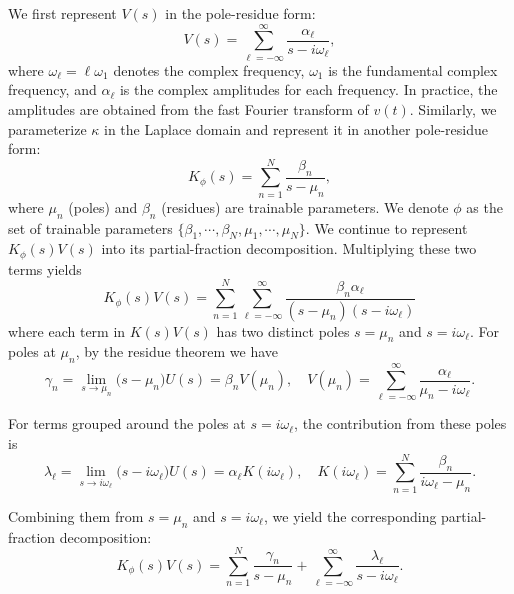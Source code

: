 We first represent $V(s)$ in the pole-residue form:
\begin{equation}\label{eq:force_laplace}
V(s)
 = 
\sum_{\ell=-\infty}^{\infty}
\frac{\alpha_{\ell}}{ s - i\omega_{\ell} },
\end{equation}
where $\omega_{\ell} = \ell \omega_1$ denotes the complex frequency, $\omega_1$  is the fundamental complex frequency, and $\alpha_{\ell}$ is the complex amplitudes for each frequency. In practice, the amplitudes are obtained from the fast Fourier transform of $v(t)$. Similarly, we parameterize $\kappa$ in the Laplace domain and represent it in another pole-residue form:
\begin{equation}\label{eq:pole_res_lap}
K_\phi(s)
 = 
\sum_{n=1}^{N}
\frac{\beta_{n}}{s - \mu_{n}},
\end{equation}
where $\mu_n$ ({poles}) and $\beta_n$ ({residues}) are trainable parameters. We denote $\phi$ as the set of trainable parameters $\{\beta_1, \cdots, \beta_N, \mu_1, \cdots, \mu_N\}$. We continue to represent $K_\phi(s) V(s)$ into its partial-fraction decomposition. Multiplying these two terms yields
$$K_\phi(s) V(s)=\sum_{n=1}^{N}
\sum_{\ell=-\infty}^{\infty}
\frac{\beta_{n}\alpha_{\ell}}{ (s - \mu_{n})(s - i\omega_{\ell}) }$$
where each term in $K(s) V(s)$ has two distinct poles $s=\mu_{n}$ and $s=i\omega_{\ell}$. 
For poles at $\mu_n$, by the residue theorem we have
\begin{equation}\label{eq:residue_gamma}
    \gamma_n
 = 
\lim_{s \to \mu_n}
\bigl(s - \mu_n\bigr) U(s)
 = 
\beta_n V(\mu_n),\quad V(\mu_n)
 = 
\sum_{\ell=-\infty}^{\infty}
\frac{\alpha_\ell}{ \mu_n - i\omega_\ell }.
\end{equation}

For terms grouped around the poles at $s=i\omega_{\ell}$, the contribution from these poles is
\begin{equation}\label{eq:residue_lambda}
    \lambda_\ell
 = 
\lim_{s \to i\omega_\ell}
\bigl(s - i\omega_\ell\bigr) U(s)
 = 
\alpha_\ell K(i\omega_\ell),\quad 
K(i\omega_\ell)
 = 
\sum_{n=1}^N
\frac{\beta_n}{ i\omega_\ell - \mu_n }.
\end{equation}


Combining them from $ s = \mu_n $ and $ s = i\omega_\ell $, we yield the corresponding partial-fraction decomposition:
\begin{equation}\label{eq:U_pole_res}
K_\phi(s) V(s)=\sum_{n=1}^N \frac{\gamma_n}{s - \mu_n} + \sum_{\ell=-\infty}^{\infty} \frac{\lambda_\ell}{s - i\omega_\ell}.
\end{equation}

